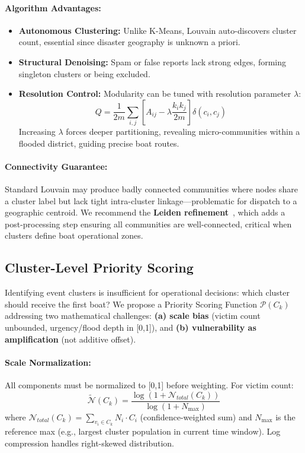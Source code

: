 \documentclass[runningheads]{llncs}
\begin{document}
\paragraph{Algorithm Advantages:}
\begin{itemize}
\item \textbf{Autonomous Clustering:} Unlike K-Means, Louvain auto-discovers cluster count, essential since disaster geography is unknown a priori.
\item \textbf{Structural Denoising:} Spam or false reports lack strong edges, forming singleton clusters or being excluded.
\item \textbf{Resolution Control:} Modularity can be tuned with resolution parameter $\lambda$:
\begin{equation}
Q = \frac{1}{2m} \sum_{i,j} \left[ A_{ij} - \lambda \frac{k_i k_j}{2m} \right] \delta(c_i, c_j)
\end{equation}
Increasing $\lambda$ forces deeper partitioning, revealing micro-communities within a flooded district, guiding precise boat routes.
\end{itemize}

\paragraph{Connectivity Guarantee:}
Standard Louvain may produce badly connected communities where nodes share a cluster label but lack tight intra-cluster linkage---problematic for dispatch to a geographic centroid. We recommend the \textbf{Leiden refinement}~\cite{traag2019leiden}, which adds a post-processing step ensuring all communities are well-connected, critical when clusters define boat operational zones.

\subsection{Cluster-Level Priority Scoring}

Identifying event clusters is insufficient for operational decisions: which cluster should receive the first boat? We propose a Priority Scoring Function $\mathcal{P}(C_k)$ addressing two mathematical challenges: \textbf{(a) scale bias} (victim count unbounded, urgency/flood depth in [0,1]), and \textbf{(b) vulnerability as amplification} (not additive offset).

\paragraph{Scale Normalization:}
All components must be normalized to [0,1] before weighting. For victim count:
\begin{equation}
\widetilde{\mathcal{N}}(C_k) = \frac{\log(1 + \mathcal{N}_{total}(C_k))}{\log(1 + N_{\max})}
\end{equation}
where $\mathcal{N}_{total}(C_k) = \sum_{v_i \in C_k} N_i \cdot C_i$ (confidence-weighted sum) and $N_{\max}$ is the reference max (e.g., largest cluster population in current time window). Log compression handles right-skewed distribution.
\end{document}
